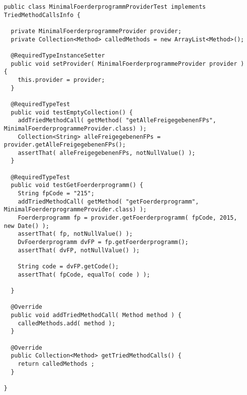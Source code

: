 \begin{lstlisting}[style = java, caption = Interface MinimalFoerderprogrammProviderTest, captionpos = b, label = lst_testklassen_tei3]
public class MinimalFoerderprogrammProviderTest implements TriedMethodCallsInfo {

  private MinimalFoerderprogrammeProvider provider;
  private Collection<Method> calledMethods = new ArrayList<Method>();

  @RequiredTypeInstanceSetter
  public void setProvider( MinimalFoerderprogrammeProvider provider ) {
    this.provider = provider;
  }

  @RequiredTypeTest
  public void testEmptyCollection() {
    addTriedMethodCall( getMethod( "getAlleFreigegebenenFPs", MinimalFoerderprogrammeProvider.class) );
    Collection<String> alleFreigegebenenFPs = provider.getAlleFreigegebenenFPs();
    assertThat( alleFreigegebenenFPs, notNullValue() );
  }

  @RequiredTypeTest
  public void testGetFoerderprogramm() {
    String fpCode = "215";
    addTriedMethodCall( getMethod( "getFoerderprogramm", MinimalFoerderprogrammeProvider.class) );
    Foerderprogramm fp = provider.getFoerderprogramm( fpCode, 2015, new Date() );
    assertThat( fp, notNullValue() );
    DvFoerderprogramm dvFP = fp.getFoerderprogramm();
    assertThat( dvFP, notNullValue() );

    String code = dvFP.getCode();
    assertThat( fpCode, equalTo( code ) );

  }

  @Override
  public void addTriedMethodCall( Method method ) {
    calledMethods.add( method );
  }

  @Override
  public Collection<Method> getTriedMethodCalls() {
    return calledMethods ;
  }

}
\end{lstlisting}
